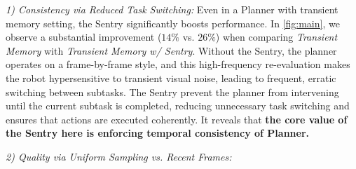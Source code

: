 \textit{1) Consistency via Reduced Task Switching:}
Even in a Planner with transient memory setting, the Sentry significantly boosts performance. 
In \autoref{fig:main}, we observe a substantial improvement ($14\%$ vs. $26\%$) when comparing \textit{Transient Memory} with \textit{Transient Memory w/ Sentry}. Without the Sentry, the planner operates on a frame-by-frame style, and this high-frequency re-evaluation makes the robot hypersensitive to transient visual noise, leading to frequent, erratic switching between subtasks. The Sentry prevent the planner from intervening until the current subtask is completed, reducing unnecessary task switching and ensures that actions are executed coherently. It reveals that \textbf{the core value of the Sentry here is enforcing temporal consistency of Planner.}


\textit{2) Quality via Uniform Sampling vs. Recent Frames:}

